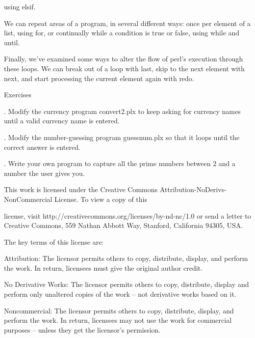 \documentclass[a4paper,11pt]{book}
\begin{document}
\noindent using elsif.

\noindent 

\noindent We can repeat areas of a program, in several different ways: once per element of a list, using for, or continually while a condition is true or false, using while and until.

\noindent 

\noindent Finally, we've examined some ways to alter the flow of perl's execution through these loops. We can break out of a loop with last, skip to the next element with next, and start processing the current element again with redo.

\noindent 

\noindent 

\noindent Exercises

\noindent 

.   Modify the currency program convert2.plx to keep asking for currency names until a valid currency name is entered.

\noindent 

.   Modify the number-guessing program guessnum.plx so that it loops until the correct answer is entered.

\noindent 

.   Write your own program to capture all the prime numbers between 2 and a number the user gives you.

\noindent  

\noindent  

\noindent  

\noindent  

\noindent 

\noindent 

\noindent 

\noindent This work is licensed under the Creative Commons Attribution-NoDerivs-NonCommercial License. To view a copy of this

\noindent license, visit http://creativecommons.org/licenses/by-nd-nc/1.0 or send a letter to Creative Commons, 559 Nathan Abbott Way, Stanford, California 94305, USA.

\noindent 

\noindent The key terms of this license are:

\noindent 

\noindent Attribution: The licensor permits others to copy, distribute, display, and perform the work. In return, licensees must give the original author credit.

\noindent 

\noindent No  Derivative  Works: The licensor permits others to copy, distribute, display and perform only unaltered copies of the work -- not derivative works based on it.

\noindent 

\noindent Noncommercial: The licensor permits others to copy, distribute, display, and perform the work. In return, licensees may not use the work for commercial purposes -- unless they get the licensor's permission.
\end{document}
